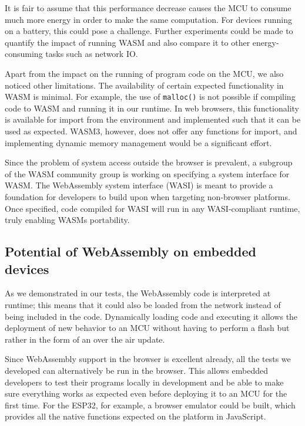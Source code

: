 It is fair to assume that this performance decrease causes the MCU to consume much more energy in order to make the same computation. For devices running on a battery, this could pose a challenge. Further experiments could be made to quantify the impact of running WASM and also compare it to other energy-consuming tasks such as network IO.

Apart from the impact on the running of program code on the MCU, we also noticed other limitations. The availability of certain expected functionality in WASM is minimal. For example, the use of \lstinline{malloc()} is not possible if compiling code to WASM and running it in our runtime. In web browsers, this functionality is available for import from the environment and implemented such that it can be used as expected. WASM3, however, does not offer any functions for import, and implementing dynamic memory management would be a significant effort.

Since the problem of system access outside the browser is prevalent, a subgroup of the WASM community group is working on specifying a system interface for WASM\autocite{clark_standardizing_2019}. The WebAssembly system interface (WASI) is meant to provide a foundation for developers to build upon when targeting non-browser platforms. Once specified, code compiled for WASI will run in any WASI-compliant runtime, truly enabling WASMs portability.

\subsection{Potential of WebAssembly on embedded devices}

As we demonstrated in our tests, the WebAssembly code is interpreted at runtime; this means that it could also be loaded from the network instead of being included in the code. Dynamically loading code and executing it allows the deployment of new behavior to an MCU without having to perform a flash but rather in the form of an over the air update.

Since WebAssembly support in the browser is excellent already, all the tests we developed can alternatively be run in the browser. This allows embedded developers to test their programs locally in development and be able to make sure everything works as expected even before deploying it to an MCU for the first time. For the ESP32, for example, a browser emulator could be built, which provides all the native functions expected on the platform in JavaScript.

